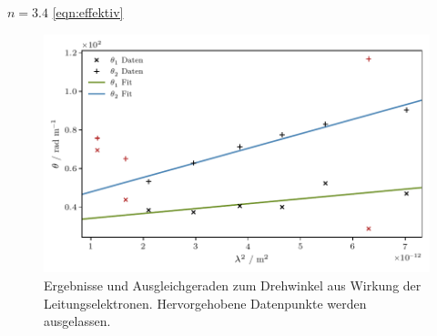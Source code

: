 $n = \num{3.4}$ \cite{brechungsindex} \eqref{eqn:effektiv}

\begin{figure}[H]
    \centering
    \includegraphics{build/mass.pdf}
    \caption{Ergebnisse und Ausgleichgeraden zum Drehwinkel aus Wirkung der Leitungselektronen.
             Hervorgehobene Datenpunkte werden ausgelassen.}
    \label{fig:masse}
\end{figure}
